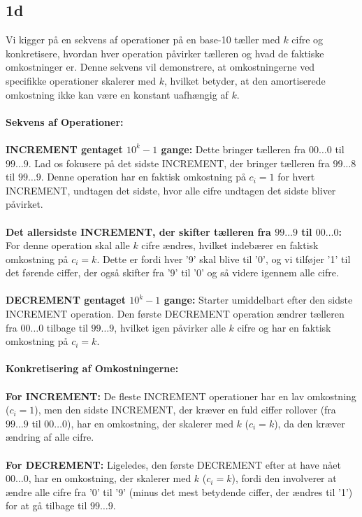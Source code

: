 \documentclass{article}
\begin{document}
\subsection{1d}
Vi kigger på en sekvens af operationer på en base-10 tæller med $k$ cifre og konkretisere, hvordan hver operation påvirker tælleren og hvad de faktiske omkostninger er. Denne sekvens vil demonstrere, at omkostningerne ved specifikke operationer skalerer med $k$, hvilket betyder, at den amortiserede omkostning ikke kan være en konstant uafhængig af $k$.
\\
\\
\textbf{Sekvens af Operationer:}
\\
\\
\textbf{INCREMENT gentaget $10^k - 1$ gange:} Dette bringer tælleren fra $00\ldots0$ til $99\ldots9$. Lad os fokusere på det sidste INCREMENT, der bringer tælleren fra $99\ldots8$ til $99\ldots9$. Denne operation har en faktisk omkostning på $c_i = 1$ for hvert INCREMENT, undtagen det sidste, hvor alle cifre undtagen det sidste bliver påvirket.
\\
\\
\textbf{Det allersidste INCREMENT, der skifter tælleren fra $99\ldots9$ til $00\ldots0$:} For denne operation skal alle $k$ cifre ændres, hvilket indebærer en faktisk omkostning på $c_i = k$. Dette er fordi hver '9' skal blive til '0', og vi tilføjer '1' til det førende ciffer, der også skifter fra '9' til '0' og så videre igennem alle cifre.
\\
\\
\textbf{DECREMENT gentaget $10^k - 1$ gange:} Starter umiddelbart efter den sidste INCREMENT operation. Den første DECREMENT operation ændrer tælleren fra $00\ldots0$ tilbage til $99\ldots9$, hvilket igen påvirker alle $k$ cifre og har en faktisk omkostning på $c_i = k$.
\\
\\
\textbf{Konkretisering af Omkostningerne:}
\\
\\
\textbf{For INCREMENT:} De fleste INCREMENT operationer har en lav omkostning ($c_i = 1$), men den sidste INCREMENT, der kræver en fuld ciffer rollover (fra $99\ldots9$ til $00\ldots0$), har en omkostning, der skalerer med $k$ ($c_i = k$), da den kræver ændring af alle cifre.
\\
\\
\textbf{For DECREMENT:} Ligeledes, den første DECREMENT efter at have nået $00\ldots0$, har en omkostning, der skalerer med $k$ ($c_i = k$), fordi den involverer at ændre alle cifre fra '0' til '9' (minus det mest betydende ciffer, der ændres til '1') for at gå tilbage til $99\ldots9$.
\end{document}
